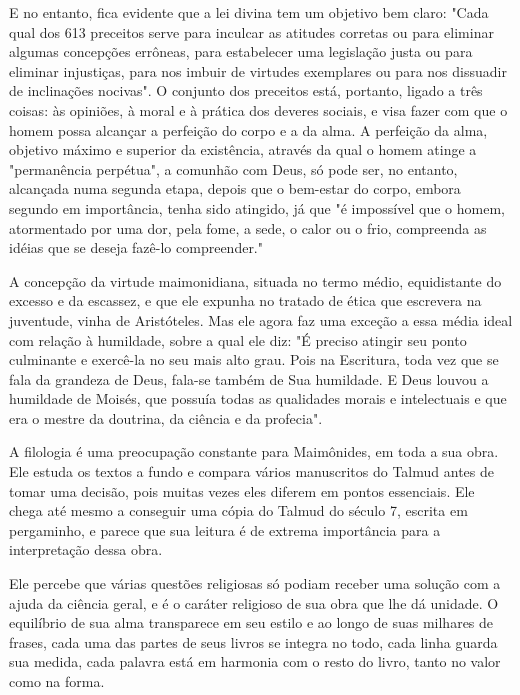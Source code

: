 \begin{itemize}
\begin{enumrate}
E no entanto, fica evidente que a lei divina tem um objetivo bem claro:
"Cada qual dos 613 preceitos serve para inculcar as atitudes corretas ou
para eliminar algumas concepções errôneas, para estabelecer uma
legislação justa ou para eliminar injustiças, para nos imbuir de
virtudes exemplares ou para nos dissuadir de inclinações nocivas". O
conjunto dos preceitos está, portanto, li­gado a três coisas: às
opiniões, à moral e à prática dos deveres sociais, e visa fazer com que
o homem possa alcançar a perfeição do corpo e a da alma. A perfeição da
alma, objetivo máximo e superior da existência, através da qual o homem
atinge a "permanência perpétua", a comunhão com Deus, só pode ser, no
entanto, alcançada numa segunda etapa, depois que o bem-estar do cor­po,
embora segundo em importância, tenha sido atingido, já que "é impossível
que o homem, atormentado por uma dor, pela fome, a sede, o calor ou o
frio, compreenda as idéias que se deseja fazê-lo compreender."

A concepção da virtude maimonidiana, situada no termo médio,
equi­distante do excesso e da escassez, e que ele expunha no tratado de
ética que escrevera na juventude, vinha de Aristóteles. Mas ele agora
faz uma exceção a essa média ideal com relação à humildade, sobre a qual
ele diz: "É preciso atingir seu ponto culminante e exercê-la no seu mais
alto grau. Pois na Escritu­ra, toda vez que se fala da grandeza de Deus,
fala-se também de Sua humildade. E Deus louvou a humildade de Moisés,
que possuía todas as qualidades morais e intelectuais e que era o mestre
da doutrina, da ciência e da profecia".

A filologia é uma preocupação constante para Maimônides, em toda a sua
obra. Ele estuda os textos a fundo e compara vários manuscritos do
Talmud antes de tomar uma decisão, pois muitas vezes eles diferem em
pontos essen­ciais. Ele chega até mesmo a conseguir uma cópia do Talmud
do século 7, es­crita em pergaminho, e parece que sua leitura é de
extrema importância para a interpretação dessa obra.

Ele percebe que várias questões religiosas só podiam receber uma solução
com a ajuda da ciência geral, e é o caráter religioso de sua obra que
lhe dá unidade. O equilíbrio de sua alma transparece em seu estilo e ao
longo de suas milhares de frases, cada uma das partes de seus livros se
integra no to­do, cada linha guarda sua medida, cada palavra está em
harmonia com o resto do livro, tanto no valor como na forma.


\end{enumrate}
\end{itemize}
